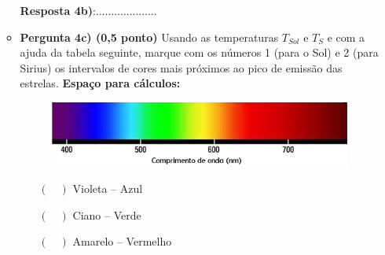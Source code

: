 \documentclass[a4paper, 12pt]{article}
\begin{document}
\begin{flushleft}
\begin{itemize}
\begin{itemize}
						\textbf{Resposta 4b)}:....................
					\item \textbf{Pergunta 4c) (0,5 ponto)} Usando as temperaturas $T_{Sol}$ e $T_S$ e com a ajuda da tabela seguinte, marque com os números 1 (para o Sol) e 2 (para Sirius) os intervalos de cores mais próximos ao pico de emissão das estrelas. \linebreak
						\textbf{Espaço para cálculos:} \linebreak \linebreak \linebreak \linebreak \linebreak \linebreak
						\begin{figure}[H]
							\centering
							\includegraphics[scale=0.5]{./img/4.png}
						\end{figure}
						\begin{multicols}{3} \begin{itemize}
							\item[$(\quad)$] Violeta -- Azul
							\item[$(\quad)$] Ciano -- Verde
							\item[$(\quad)$] Amarelo -- Vermelho
						\end{itemize} \end{multicols}
				\end{itemize}
				

\end{itemize}
\end{flushleft}
\end{document}
